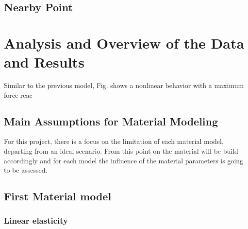 \subsection{Nearby Point}
\label{subsection:nearbypoint}



\section{Analysis and Overview of the Data and Results}

Similar to the previous model, Fig. %
shows a nonlinear behavior with a maximum force reac

\subsection{Main Assumptions for Material Modeling}

For this project, there is a focus on the limitation of each material model, 
departing from an ideal scenario. From this point on the material will be build 
accordingly and for each model the influence of the material parameters is going
to be assessed.

\subsection{First Material model}

\subsubsection{Linear elasticity}



